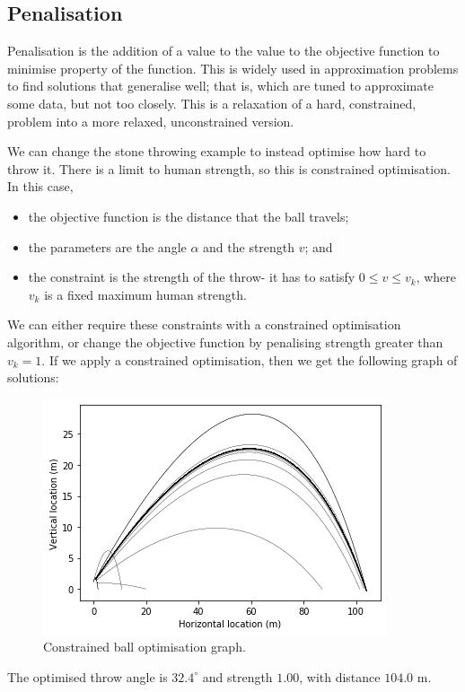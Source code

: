 \documentclass[a4paper, openany]{memoir}
\begin{document}
\subsection{Penalisation}
Penalisation is the addition of a value to the value to the objective function to minimise property of the function. This is widely used in approximation problems to find solutions that generalise well; that is, which are tuned to approximate some data, but not too closely. This is a relaxation of a hard, constrained, problem into a more relaxed, unconstrained version.

We can change the stone throwing example to instead optimise how hard to throw it. There is a limit to human strength, so this is constrained optimisation. In this case,
\begin{itemize}
    \item the objective function is the distance that the ball travels;
    \item the parameters are the angle $\alpha$ and the strength $v$; and
    \item the constraint is the strength of the throw- it has to satisfy $0 \leq v \leq v_k$, where $v_k$ is a fixed maximum human strength.
\end{itemize}
We can either require these constraints with a constrained optimisation algorithm, or change the objective function by penalising strength greater than $v_k = 1$. If we apply a constrained optimisation, then we get the following graph of solutions:
\begin{figure}[H]
    \centering
    \includegraphics[scale=0.6]{src/4.4 constrained ball optimisation.png}
    \caption{Constrained ball optimisation graph.}
\end{figure}
\noindent The optimised throw angle is $32.4^{\circ}$ and strength $1.00$, with distance $104.0$ m. 
\end{document}
